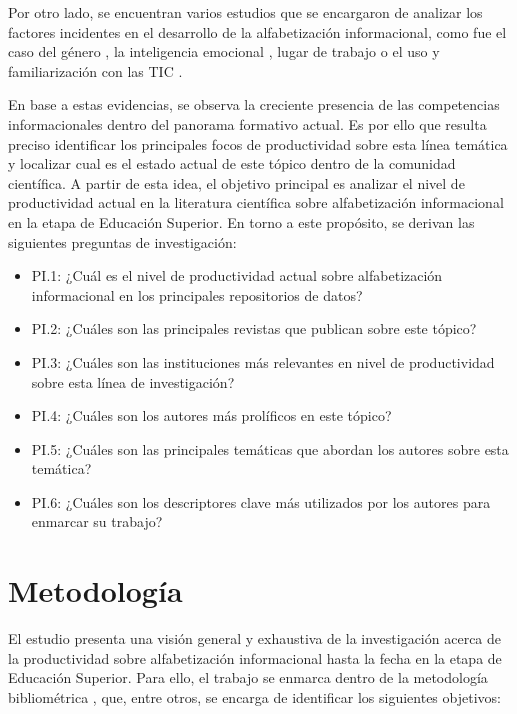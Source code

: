 \documentclass{textolivre}
\begin{document}
Por otro lado, se encuentran varios estudios que se encargaron de analizar los factores incidentes en el desarrollo de la alfabetización informacional, como fue el caso del género \cite{pinto2019}, %
la inteligencia emocional \cite{soroya2020}, %
lugar de trabajo \cite{ahmad2020} %
o el uso y familiarización con las TIC \cite{lorenz2019}. %

En base a estas evidencias, se observa la creciente presencia de las competencias informacionales dentro del panorama formativo actual. Es por ello que resulta preciso identificar los principales focos de productividad sobre esta línea temática y localizar cual es el estado actual de este tópico dentro de la comunidad científica. A partir de esta idea, el objetivo principal es analizar el nivel de productividad actual en la literatura científica sobre alfabetización informacional en la etapa de Educación Superior. En torno a este propósito, se derivan las siguientes preguntas de investigación:

\begin{itemize}
    \item PI.1: ¿Cuál es el nivel de productividad actual sobre alfabetización informacional en los principales repositorios de datos?
    \item PI.2: ¿Cuáles son las principales revistas que publican sobre este tópico?
    \item PI.3: ¿Cuáles son las instituciones más relevantes en nivel de productividad sobre esta línea de investigación?
    \item PI.4: ¿Cuáles son los autores más prolíficos en este tópico?
    \item PI.5: ¿Cuáles son las principales temáticas que abordan los autores sobre esta temática?
    \item PI.6: ¿Cuáles son los descriptores clave más utilizados por los autores para enmarcar su trabajo?
\end{itemize}

\section{Metodología}
El estudio presenta una visión general y exhaustiva de la investigación acerca de la productividad sobre alfabetización informacional hasta la fecha en la etapa de Educación Superior. Para ello, el trabajo se enmarca dentro de la metodología bibliométrica \cite{vaneck2014, cruz1999, fernandezcano1999}, %
que, entre otros, se encarga de identificar los siguientes objetivos:
\end{document}
